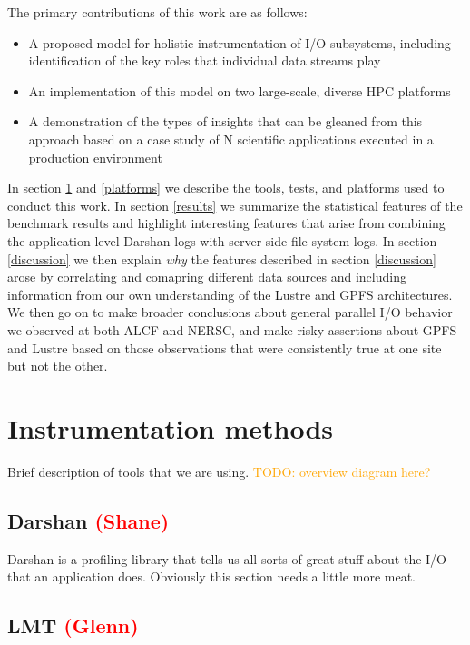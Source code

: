 \documentclass[conference,10pt,compsocconf]{IEEEtran}
\newcommand{\assign}[1]{\textcolor{red}{(#1)}}
\newcommand{\todo}[1]{\textcolor{Orange}{TODO: #1}}
\begin{document}

The primary contributions of this work are as follows:

\begin{itemize}
\item A proposed model for holistic instrumentation of I/O subsystems,
including identification of the key roles that individual data streams play
\item An implementation of this model on two large-scale, diverse HPC
platforms
\item A demonstration of the types of insights that can be gleaned from this
approach based on a case study of N scientific applications executed in a
production environment
\end{itemize}

In section \ref{methods} and \ref{platforms} we describe the tools, tests, and
platforms used to conduct this work.  In section \ref{results} we summarize the
statistical features of the benchmark results and highlight interesting features
that arise from combining the application-level Darshan logs with server-side
file system logs.  In section \ref{discussion} we then explain \emph{why} the
features described in section \ref{discussion} arose by correlating and
comapring different data sources and including information from our own
understanding of the Lustre and GPFS architectures.  We then go on to make
broader conclusions about general parallel I/O behavior we observed at both
ALCF and NERSC, and make risky assertions about GPFS and Lustre based on those
observations that were consistently true at one site but not the other.

\section{Instrumentation methods} \label{methods}

Brief description of tools that we are using.
\todo{overview diagram here?}

\subsection{Darshan \assign{Shane}}

Darshan \cite{carns200924} is a profiling library that tells us all sorts of
great stuff about the I/O that an application does.  Obviously this section
needs a little more meat.

\subsection{LMT \assign{Glenn}}
\end{document}
